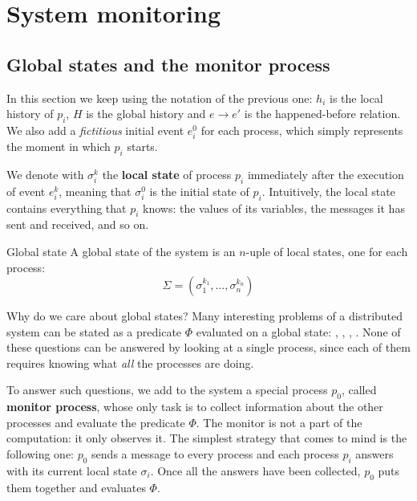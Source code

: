 
\section{System monitoring}

\subsection{Global states and the monitor process}

In this section we keep using the notation of the previous one: $h_i$ is the local history of $p_i$, $H$ is the global history and $e \to e'$ is the happened-before relation. We also add a \textit{fictitious} initial event $e_i^0$ for each process, which simply represents the moment in which $p_i$ starts.

We denote with $\sigma_i^k$ the \textbf{local state} of process $p_i$ immediately after the execution of event $e_i^k$, meaning that $\sigma_i^0$ is the initial state of $p_i$. Intuitively, the local state contains everything that $p_i$ knows: the values of its variables, the messages it has sent and received, and so on.

\begin{frameddefn}{Global state}
  A global state of the system is an $n$-uple of local states, one for each process:
  \[\Sigma = (\sigma_1^{k_1}, \ldots, \sigma_n^{k_n})\]
\end{frameddefn}

Why do we care about global states? Many interesting problems of a distributed system can be stated as a predicate $\Phi$ evaluated on a global state: , , , . None of these questions can be answered by looking at a single process, since each of them requires knowing what \textit{all} the processes are doing.

To answer such questions, we add to the system a special process $p_0$, called \textbf{monitor process}, whose only task is to collect information about the other processes and evaluate the predicate $\Phi$. The monitor is not a part of the computation: it only observes it. The simplest strategy that comes to mind is the following one: $p_0$ sends a  message to every process and each process $p_i$ answers with its current local state $\sigma_i$. Once all the answers have been collected, $p_0$ puts them together and evaluates $\Phi$.

